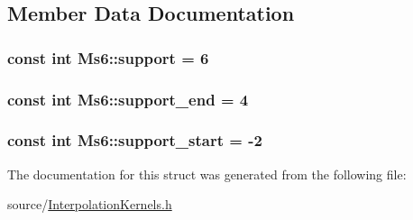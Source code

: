 \subsection{Member Data Documentation}
\hypertarget{struct_ms6_ac772f8b51bb556169f9465af9adb2ae8}{}
\subsubsection[{support}]{\setlength{\rightskip}{0pt plus 5cm}const int Ms6\+::support = 6\hspace{0.3cm}{\ttfamily [static]}}\label{struct_ms6_ac772f8b51bb556169f9465af9adb2ae8}
\hypertarget{struct_ms6_ae435e121585184ae5a790dd535741697}{}
\subsubsection[{support\+\_\+end}]{\setlength{\rightskip}{0pt plus 5cm}const int Ms6\+::support\+\_\+end = 4\hspace{0.3cm}{\ttfamily [static]}}\label{struct_ms6_ae435e121585184ae5a790dd535741697}
\hypertarget{struct_ms6_a51396c124a733a80c6ed4248191c3f67}{}
\subsubsection[{support\+\_\+start}]{\setlength{\rightskip}{0pt plus 5cm}const int Ms6\+::support\+\_\+start = -\/2\hspace{0.3cm}{\ttfamily [static]}}\label{struct_ms6_a51396c124a733a80c6ed4248191c3f67}


The documentation for this struct was generated from the following file\+:\begin{DoxyCompactItemize}
\item 
source/\hyperlink{_interpolation_kernels_8h}{Interpolation\+Kernels.\+h}\end{DoxyCompactItemize}
